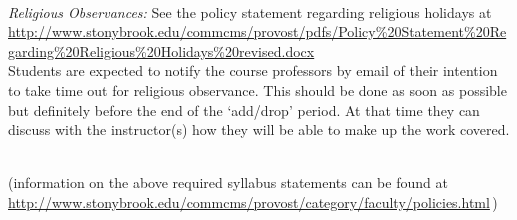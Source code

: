 \documentclass[11pt]{article}
\begin{document}
\ \\[-1.5mm]
\noindent 
{\em Religious Observances: }
%
See the policy statement regarding religious holidays at \\[0.25em]
{\footnotesize \url{http://www.stonybrook.edu/commcms/provost/pdfs/Policy\%20Statement\%20Regarding\%20Religious\%20Holidays\%20revised.docx}}
\\[0.25em]
%
Students are expected to notify the course professors by email of
their intention to take time out for religious observance.  This
should be done as soon as possible but definitely before the end of
the `add/drop' period.  At that time they can discuss with the
instructor(s) how they will be able to make up the work covered.






\ \\[3 mm]
\noindent
(information on the above required syllabus statements can be found at \\
\url{http://www.stonybrook.edu/commcms/provost/category/faculty/policies.html}\,)
\end{document}
